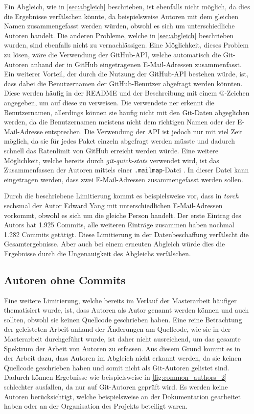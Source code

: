 Ein Abgleich, wie in \autoref{sec:abgleich} beschrieben, ist ebenfalls nicht möglich, da dies die Ergebnisse verfälschen könnte, da beispielsweise Autoren mit dem gleichen Namen zusammengefasst werden würden, obwohl es sich um unterschiedliche Autoren handelt.
Die anderen Probleme, welche in \autoref{sec:abgleich} beschrieben wurden, sind ebenfalls nicht zu vernachlässigen.
Eine Möglichkeit, dieses Problem zu lösen, wäre die Verwendung der GitHub-API, welche automatisch die Git-Autoren anhand der in GitHub eingetragenen E-Mail-Adressen zusammenfasst.
Ein weiterer Vorteil, der durch die Nutzung der GitHub-API bestehen würde, ist, dass dabei die Benutzernamen der GitHub-Benutzer abgefragt werden könnten.
Diese werden häufig in der README und der Beschreibung mit einem @-Zeichen angegeben, um auf diese zu verweisen.
Die verwendete \gls{ner} erkennt die Benutzernamen, allerdings können sie häufig nicht mit den Git-Daten abgeglichen werden, da die Benutzernamen meistens nicht dem richtigen Namen oder der E-Mail-Adresse entsprechen.
Die Verwendung der API ist jedoch nur mit viel Zeit möglich, da sie für jedes Paket einzeln abgefragt werden müsste und dadurch schnell das Ratenlimit von GitHub erreicht werden würde.
Eine weitere Möglichkeit, welche bereits durch \emph{git-quick-stats} verwendet wird, ist das Zusammenfassen der Autoren mittels einer \texttt{.mailmap}-Datei \autocite{chacon_git_2024-1}.
In dieser Datei kann eingetragen werden, dass zwei E-Mail-Adressen zusammengefasst werden sollen.

Durch die beschriebene Limitierung kommt es beispielsweise vor, dass in \emph{torch} sechsmal der Autor \glqq Edward Yang\grqq{} mit unterschiedlichen E-Mail-Adressen vorkommt, obwohl es sich um die gleiche Person handelt.
Der erste Eintrag des Autors hat 1.925 Commits, alle weiteren Einträge zusammen haben nochmal 1.282 Commits getätigt.
Diese Limitierung in der Datenbeschaffung verfälscht die Gesamtergebnisse.
Aber auch bei einem erneuten Abgleich würde dies die Ergebnisse durch die Ungenauigkeit des Abgleichs verfälschen.

\subsection*{Autoren ohne Commits}
\label{sec:autoren_ohne_commits}
Eine weitere Limitierung, welche bereits im Verlauf der Masterarbeit häufiger thematisiert wurde, ist, dass Autoren als Autor genannt werden können und auch sollten, obwohl sie keinen Quellcode geschrieben haben.
Eine reine Betrachtung der geleisteten Arbeit anhand der Änderungen am Quellcode, wie sie in der Masterarbeit durchgeführt wurde, ist daher nicht ausreichend, um das gesamte Spektrum der Arbeit von Autoren zu erfassen.
Aus diesem Grund kommt es in der Arbeit dazu, dass Autoren im Abgleich nicht erkannt werden, da sie keinen Quellcode geschrieben haben und somit nicht als Git-Autoren gelistet sind.
Dadurch können Ergebnisse wie beispielsweise in \autoref{fig:common_authors_2} schlechter ausfallen, da nur auf Git-Autoren geprüft wird.
Es werden keine Autoren berücksichtigt, welche beispielsweise an der Dokumentation gearbeitet haben oder an der Organisation des Projekts beteiligt waren.

